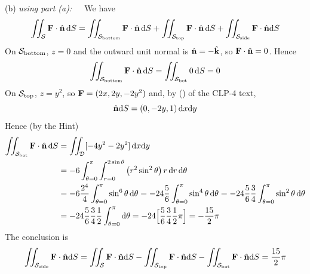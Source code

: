 \begin{solution}
(b) \emph{using part (a):}\ \ \ 
We have 
\begin{equation*}
\iint_{\mathcal{S}}\mathbf{F}\cdot \hat{\mathbf{n}}\,\mathrm{d}S
= \iint_{\cal S_{\rm bottom}}\mathbf{F}\cdot \hat{\mathbf{n}}\,\mathrm{d}S
+ \iint_{\cal S_{\rm top}}\mathbf{F}\cdot \hat{\mathbf{n}}\,\mathrm{d}S
+ \iint_{\cal S_{\rm side}}\mathbf{F}\cdot \hat{\mathbf{n}}\mathrm{d}S
\end{equation*}
On ${\cal S_{\rm bottom}}$, $z=0$ and the outward unit normal is
$\hat{\mathbf{n}}=-\hat{\mathbf{k}}$, so $\mathbf{F}\cdot\hat{\mathbf{n}} = 0$. Hence
$$
\iint_{\cal S_{\rm bottom}}\mathbf{F}\cdot \hat{\mathbf{n}}\,\mathrm{d}S
= \iint_{\cal S_{\rm bot}} 0\,\mathrm{d}S
= 0
$$
On ${\cal S_{\rm top}}$, $z=y^2$,
so $\mathbf{F} = (2x,2y,-2y^2)$ and,  
by () of the CLP-4 text,
$$
\hat{\mathbf{n}}\mathrm{d}S
= {(0,-2y,1)}\,\mathrm{d}x\mathrm{d}y
$$
Hence (by the Hint)
\begin{align*}
\iint_{\cal S_{\rm bot}}\mathbf{F}\cdot \hat{\mathbf{n}}\,\mathrm{d}S
&= \iint_{\mathcal{D}}[-4y^2 - 2y^2]\,\mathrm{d}x\mathrm{d}y
\\
&= -6\int_{\theta=0}^{\pi} \int_{r=0}^{2\sin\theta}
\big(r^2\sin^2\theta\big)\,r\,\mathrm{d}r\,\mathrm{d}\theta
\\
&= -6\frac{2^4}{4}\int_{\theta=0}^{\pi} \sin^6\theta\,\mathrm{d}\theta
=-24\frac{5}{6}\int_{\theta=0}^{\pi} \sin^4\theta\,\mathrm{d}\theta
=-24\frac{5}{6}\frac{3}{4}\int_{\theta=0}^{\pi} \sin^2\theta\,\mathrm{d}\theta \\
&=-24\frac{5}{6}\frac{3}{4}\frac{1}{2}\int_{\theta=0}^{\pi}\mathrm{d}\theta 
= -24\Big[\frac{5}{6}\frac{3}{4}\frac{1}{2}\pi\Big]
= -\frac{15}{2}\pi
\end{align*}
The conclusion is
$$
\iint_{\cal S_{\rm side}}\mathbf{F}\cdot \hat{\mathbf{n}}\mathrm{d}S
= \iint_{\mathcal{S}}\mathbf{F}\cdot \hat{\mathbf{n}}\mathrm{d}S
- \iint_{\cal S_{\rm top}}\mathbf{F}\cdot \hat{\mathbf{n}}\mathrm{d}S
- \iint_{\cal S_{\rm bot}}\mathbf{F}\cdot \hat{\mathbf{n}}\mathrm{d}S
= \frac{15}{2}\pi
$$


\end{solution}
